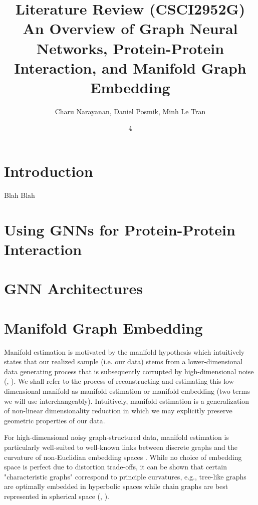 \documentclass[twoside,11pt]{article}
\begin{document}
\title{	Literature Review (CSCI2952G) \\
\vspace{.1in}
An Overview of Graph Neural Networks, Protein-Protein Interaction, and Manifold Graph Embedding 	
}

\author{Charu Narayanan, Daniel Posmik, Minh Le Tran}

\maketitle
\date{4 }

\section{Introduction} \label{sec:intro}

Blah Blah 

\section{Using GNNs for Protein-Protein Interaction} \label{sec:application}

\citet{jha_etal_2022}

\section{GNN Architectures} \label{sec:architecture}

\section{Manifold Graph Embedding} \label{sec:manifold}

Manifold estimation is motivated by the manifold hypothesis \citep{fefferman_etal_2013} which intuitively states that our realized sample (i.e. our data) stems from a lower-dimensional data generating process that is subsequently corrupted by high-dimensional noise (\citet{fefferman_etal_2013}, \citet{meng_eloyan_2021}). We shall refer to the process of reconstructing and estimating this low-dimensional manifold as manifold estimation or manifold embedding (two terms we will use interchangeably). Intuitively, manifold estimation is a generalization of non-linear dimensionality reduction in which we may explicitly preserve geometric properties of our data.  

For high-dimensional noisy graph-structured data, manifold estimation is particularly well-suited to well-known links between discrete graphs and the curvature of non-Euclidian embedding spaces \citep{bronstein_etal_2017}. While no choice of embedding space is perfect due to distortion trade-offs, it can be shown that certain "characteristic graphs" correspond to principle curvatures, e.g., tree-like graphs are optimally embedded in hyperbolic spaces while chain graphs are best represented in spherical space (\citet{weber_2018}, \citet{weber_2020}). 
\end{document}
